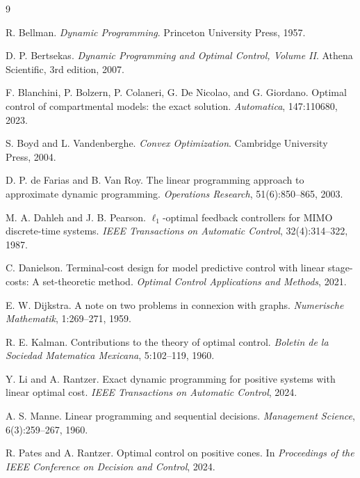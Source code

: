 \documentclass{article}
\begin{document}
\begin{thebibliography}{9}

R. Bellman.
\newblock \emph{Dynamic Programming}.
\newblock Princeton University Press, 1957.

D. P. Bertsekas.
\newblock \emph{Dynamic Programming and Optimal Control, Volume II}.
\newblock Athena Scientific, 3rd edition, 2007.

F. Blanchini, P. Bolzern, P. Colaneri, G. De Nicolao, and G. Giordano.
\newblock Optimal control of compartmental models: the exact solution.
\newblock \emph{Automatica}, 147:110680, 2023.

S. Boyd and L. Vandenberghe.
\newblock \emph{Convex Optimization}.
\newblock Cambridge University Press, 2004.

D. P. de Farias and B. Van Roy.
\newblock The linear programming approach to approximate dynamic programming.
\newblock \emph{Operations Research}, 51(6):850--865, 2003.

M. A. Dahleh and J. B. Pearson.
\newblock $\ell_1$-optimal feedback controllers for MIMO discrete-time systems.
\newblock \emph{IEEE Transactions on Automatic Control}, 32(4):314--322, 1987.

C. Danielson.
\newblock Terminal-cost design for model predictive control with linear stage-costs: A set-theoretic method.
\newblock \emph{Optimal Control Applications and Methods}, 2021.

E. W. Dijkstra.
\newblock A note on two problems in connexion with graphs.
\newblock \emph{Numerische Mathematik}, 1:269--271, 1959.

R. E. Kalman.
\newblock Contributions to the theory of optimal control.
\newblock \emph{Boletin de la Sociedad Matematica Mexicana}, 5:102--119, 1960.

Y. Li and A. Rantzer.
\newblock Exact dynamic programming for positive systems with linear optimal cost.
\newblock \emph{IEEE Transactions on Automatic Control}, 2024.

A. S. Manne.
\newblock Linear programming and sequential decisions.
\newblock \emph{Management Science}, 6(3):259--267, 1960.

R. Pates and A. Rantzer.
\newblock Optimal control on positive cones.
\newblock In \emph{Proceedings of the IEEE Conference on Decision and Control}, 2024.


\end{thebibliography}
\end{document}

